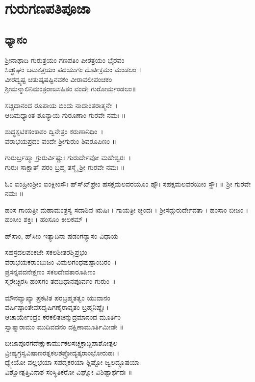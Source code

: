 \section{ಗುರುಗಣಪತಿಪೂಜಾ}
\subsection{ಧ್ಯಾನಂ}


ಶ್ರೀನಾಥಾದಿ ಗುರುತ್ರಯಂ ಗಣಪತಿಂ ಪೀಠತ್ರಯಂ ಭೈರವಂ\\
ಸಿದ್ಧೌಘಂ ಬಟುಕತ್ರಯಂ ಪದಯುಗಂ ದೂತೀಕ್ರಮಂ ಮಂಡಲಂ~।\\
ವೀರದ್ವ್ಯಷ್ಟ ಚತುಷ್ಕಷಷ್ಟಿನವಕಂ ವೀರಾವಲೀಪಂಚಕಂ\\
ಶ್ರೀಮನ್ಮಾಲಿನಿಮಂತ್ರರಾಜಸಹಿತಂ ವಂದೇ ಗುರೋರ್ಮಂಡಲಂ॥

ಸಚ್ಚಿದಾನಂದ ರೂಪಾಯ ಬಿಂದು ನಾದಾಂತರಾತ್ಮನೇ~।\\
ಆದಿಮಧ್ಯಾಂತ ಶೂನ್ಯಾಯ ಗುರೂಣಾಂ ಗುರವೇ ನಮಃ ॥

ಶುದ್ಧಸ್ಫಟಿಕಸಂಕಾಶಂ ದ್ವಿನೇತ್ರಂ ಕರುಣಾನಿಧಿಂ~।\\
ವರಾಭಯಪ್ರದಂ ವಂದೇ ಶ್ರೀಗುರುಂ ಶಿವರೂಪಿಣಂ ॥

ಗುರುರ್ಬ್ರಹ್ಮಾ ಗ್ರುರುರ್ವಿಷ್ಣುಃ ಗುರುರ್ದೇವೋ ಮಹೇಶ್ವರಃ~।\\
ಗುರುಃ ಸಾಕ್ಷಾತ್ ಪರಂ ಬ್ರಹ್ಮ ತಸ್ಮೈ ಶ್ರೀ ಗುರವೇ ನಮಃ ॥


ಓಂ ಐಂಹ್ರೀಂಶ್ರೀಂ ಐಂಕ್ಲೀಂಸೌಃ ಹ್‌ಸ್‌ಖ್‌ಫ್ರೇಂ ಹಸಕ್ಷಮಲವರಯೂಂ ಹ್ಸೌಃ ಸಹಕ್ಷಮಲವರಯೀಂ ಸ್ಹೌಃ ॥  ಶ್ರೀ ಗುರವೇ ನಮಃ ॥

ಹಂಸ ಗಾಯತ್ರೀ ಮಹಾಮಂತ್ರಸ್ಯ ಸದಾಶಿವ ಋಷಿಃ । ಗಾಯತ್ರೀ ಚ್ಛಂದಃ । ಶ್ರೀಸದ್ಗುರುರ್ದೇವತಾ । ಹಂಸಾಂ ಬೀಜಂ । ಹಂಸೀಂ ಶಕ್ತಿಃ । ಹಂಸೂಂ ಕೀಲಕಮ್ ।

ಹ್‌ಸಾಂ, ಹ್‌ಸೀಂ ಇತ್ಯಾದಿನಾ ಷಡಂಗನ್ಯಾಸಂ ವಿಧಾಯ

ಸಹಸ್ರದಲಪಂಕಜೇ ಸಕಲಶೀತರಶ್ಮಿಪ್ರಭಂ\\
ವರಾಭಯಕರಾಂಬುಜಂ ವಿಮಲಗಂಧಪುಷ್ಪಾಂಬರಂ~।\\
ಪ್ರಸನ್ನವದನೇಕ್ಷಣಂ ಸಕಲದೇವತಾರೂಪಿಣಂ\\
ಸ್ಮರೇಚ್ಛಿರಸಿ ಹಂಸಗಂ ತದಭಿಧಾನಪೂರ್ವಂ ಗುರುಂ ॥


ಮೌನವ್ಯಾಖ್ಯಾ ಪ್ರಕಟಿತ ಪರಬ್ರಹ್ಮತತ್ವಂ ಯುವಾನಂ\\
ವರ್ಷಿಷ್ಠಾಂತೇವಸದೃಷಿಗಣೈರಾವೃತಂ ಬ್ರಹ್ಮನಿಷ್ಠೈಃ ।\\
ಆಚಾರ್ಯೇಂದ್ರಂ ಕರಕಲಿತಚಿನ್ಮುದ್ರಮಾನಂದ ಮೂರ್ತಿಂ\\
ಸ್ವಾತ್ಮಾರಾಮಂ ಮುದಿವದನಂ ದಕ್ಷಿಣಾಮೂರ್ತಿಮೀಡೇ ॥




ಬೀಜಾಪೂರಗದೇಕ್ಷುಕಾರ್ಮುಕಲಸಚ್ಚಕ್ರಾಬ್ಜಪಾಶೋತ್ಪಲ\\ವ್ರೀಹ್ಯಗ್ರಸ್ವವಿಷಾಣರತ್ನಕಲಶಪ್ರೋದ್ಯತ್ಕರಾಂಭೋರುಹಃ ।\\
ಧ್ಯ್ಯೇಯೋ ವಲ್ಲಭಯಾ ಸಪದ್ಮಕರಯಾ ಶ್ಲಿಷ್ಟೋ ಜ್ವಲದ್ಭೂಷಯಾ\\ ವಿಶ್ವೋತ್ಪತ್ತಿವಿನಾಶ ಸಂಸ್ಥಿತಿಕರೋ ವಿಘ್ನೋ ವಿಶಿಷ್ಟಾರ್ಥದಃ ॥
